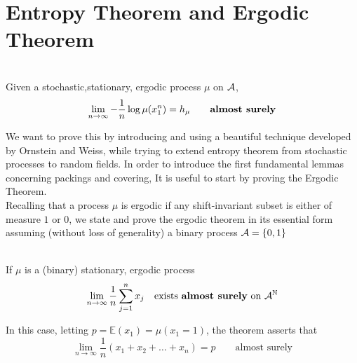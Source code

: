 \section{Entropy Theorem and Ergodic Theorem}

\begin{theorem}
\hfill \\
    Given a stochastic,stationary, ergodic process $\mu$ on $\mathcal{A}$,
    \begin{equation}
        \lim_{n \rightarrow \infty} -\frac{1}{n} \log \mu(x_1^n) = h_\mu \qquad \text{\textbf{almost surely}}
    \end{equation}
\end{theorem}
We want to prove this by introducing and using a beautiful technique
developed by Ornstein and Weiss, while trying to extend entropy theorem
from stochastic processes to random fields. In order to introduce the first fundamental lemmas concerning packings and covering, It is useful to start by proving the Ergodic Theorem.
\\Recalling that a process $\mu$ is ergodic if any shift-invariant subset is either of measure $1$ or $0$, we state and prove the ergodic theorem in its essential form assuming (without loss of generality) a binary process $\mathcal{A}= \{0,1 \}$
\begin{theorem}
\hfill \\
    If $\mu$ is a (binary) stationary, ergodic process
    \begin{equation*}
        \lim_{n \rightarrow \infty} \frac{1}{n} \sum_{j=1}^n x_j \quad \text{exists \textbf{almost surely} on } \mathcal{A}^{\mathbb{N}}
    \end{equation*}
\end{theorem}
In this case, letting $p = \mathbb{E}(x_1) = \mu(x_1=1)$, the theorem asserts that 
\begin{equation*}
    \lim_{n \rightarrow \infty} \frac{1}{n} (x_1 + x_2 +\dots+ x_n) = p \qquad \text{almost surely}
\end{equation*}
